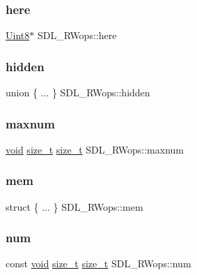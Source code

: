 \subsubsection{\texorpdfstring{here}{here}}
{\footnotesize\ttfamily \mbox{\hyperlink{_s_d_l__stdinc_8h_a2944638813a090aa23e62f4da842c3e2}{Uint8}}$\ast$ S\+D\+L\+\_\+\+R\+Wops\+::here}

\mbox{\label{struct_s_d_l___r_wops_a92c73a5eabda369d822ddac6e95fd7fb}} 
\subsubsection{\texorpdfstring{hidden}{hidden}}
{\footnotesize\ttfamily union \{ ... \}   S\+D\+L\+\_\+\+R\+Wops\+::hidden}

\mbox{\label{struct_s_d_l___r_wops_a7786282ec28451085908f70048ee32c8}} 
\subsubsection{\texorpdfstring{maxnum}{maxnum}}
{\footnotesize\ttfamily \mbox{\hyperlink{_s_d_l__opengles2__gl2ext_8h_ae5d8fa23ad07c48bb609509eae494c95}{void}} \mbox{\hyperlink{detail_2common_8h_a801d6a451a01953ef8cbae6feb6a3638}{size\+\_\+t}} \mbox{\hyperlink{detail_2common_8h_a801d6a451a01953ef8cbae6feb6a3638}{size\+\_\+t}} S\+D\+L\+\_\+\+R\+Wops\+::maxnum}

\mbox{\label{struct_s_d_l___r_wops_ad65f424ffdc50b2da45def5137d37c20}} 
\subsubsection{\texorpdfstring{mem}{mem}}
{\footnotesize\ttfamily struct \{ ... \}   S\+D\+L\+\_\+\+R\+Wops\+::mem}

\mbox{\label{struct_s_d_l___r_wops_a630921d5c84cf48a4a10f9a75e1caa10}} 
\subsubsection{\texorpdfstring{num}{num}}
{\footnotesize\ttfamily const \mbox{\hyperlink{_s_d_l__opengles2__gl2ext_8h_ae5d8fa23ad07c48bb609509eae494c95}{void}} \mbox{\hyperlink{detail_2common_8h_a801d6a451a01953ef8cbae6feb6a3638}{size\+\_\+t}} \mbox{\hyperlink{detail_2common_8h_a801d6a451a01953ef8cbae6feb6a3638}{size\+\_\+t}} S\+D\+L\+\_\+\+R\+Wops\+::num}

